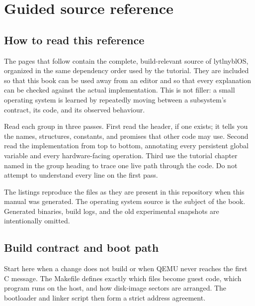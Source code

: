 \part{Guided source reference}

\chapter{How to read this reference}
The pages that follow contain the complete, build-relevant source of lytlnyblOS, organized in the same dependency order used by the tutorial. They are included so that this book can be used away from an editor and so that every explanation can be checked against the actual implementation. This is not filler: a small operating system is learned by repeatedly moving between a subsystem's contract, its code, and its observed behaviour.

Read each group in three passes. First read the header, if one exists; it tells you the names, structures, constants, and promises that other code may use. Second read the implementation from top to bottom, annotating every persistent global variable and every hardware-facing operation. Third use the tutorial chapter named in the group heading to trace one live path through the code. Do not attempt to understand every line on the first pass.

The listings reproduce the files as they are present in this repository when this manual was generated. The operating system source is the subject of the book. Generated binaries, build logs, and the old experimental  snapshots are intentionally omitted.

\newcommand{\sourcefile}[2]{\section{\protect\pathname{#1}}\noindent\textit{Study focus:} #2\par\medskip{\small}\clearpage}

\chapter{Build contract and boot path}
Start here when a change does not build or when QEMU never reaches the first C message. The Makefile defines exactly which files become guest code, which program runs on the host, and how disk-image sectors are arranged. The bootloader and linker script then form a strict address agreement.

